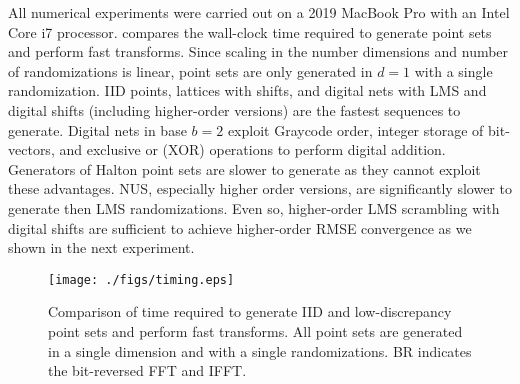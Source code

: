 \documentclass[acmsmall]{acmart}
\begin{document}
All numerical experiments were carried out on a 2019 MacBook Pro with an Intel Core i7 processor.  compares the wall-clock time required to generate point sets and perform fast transforms. Since scaling in the number dimensions and number of randomizations is linear, point sets are only generated in $d=1$ with a single randomization. IID points, lattices with shifts, and digital nets with LMS and digital shifts (including higher-order versions) are the fastest sequences to generate. Digital nets in base $b=2$ exploit Graycode order, integer storage of bit-vectors, and exclusive or (XOR) operations to perform digital addition. Generators of Halton point sets are slower to generate as they cannot exploit these advantages. NUS, especially higher order versions, are significantly slower to generate then LMS randomizations. Even so, higher-order LMS scrambling with digital shifts are sufficient to achieve higher-order RMSE convergence as we shown in the next experiment.  

\begin{figure}%
    \centering
    \texttt{[image: ./figs/timing.eps]}
    \caption{Comparison of time required to generate IID and low-discrepancy point sets and perform fast transforms. All point sets are generated in a single dimension and with a single randomizations. BR indicates the bit-reversed FFT and IFFT.}
    \Description[]{}
    \label{fig:timing}
\end{figure}
\end{document}

